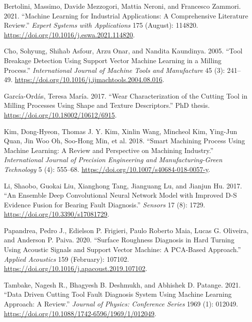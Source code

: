 \documentclass[
  letterpaper,
  DIV=11,
  numbers=noendperiod]{scrartcl}
\newlength{\cslhangindent}
\newlength{\cslentryspacingunit} %
\newenvironment{CSLReferences}[2] %
 {%
  \setlength{\parindent}{0pt}
  \ifodd #1
  \let\oldpar\par
  \def\par{\hangindent=\cslhangindent\oldpar}
  \fi
  \setlength{\parskip}{#2\cslentryspacingunit}
 }%
 {}
\begin{document}
\hypertarget{refs}{}
\begin{CSLReferences}{1}{0}
\leavevmode{}%
Bertolini, Massimo, Davide Mezzogori, Mattia Neroni, and Francesco
Zammori. 2021. {``Machine {Learning} for Industrial Applications: {A}
Comprehensive Literature Review.''} \emph{Expert Systems with
Applications} 175 (August): 114820.
\url{https://doi.org/10.1016/j.eswa.2021.114820}.

\leavevmode{}%
Cho, Sohyung, Shihab Asfour, Arzu Onar, and Nandita Kaundinya. 2005.
{``Tool Breakage Detection Using Support Vector Machine Learning in a
Milling Process.''} \emph{International Journal of Machine Tools and
Manufacture} 45 (3): 241--49.
\url{https://doi.org/10.1016/j.ijmachtools.2004.08.016}.

\leavevmode{}%
García-Ordás, Teresa María. 2017. {``Wear Characterization of the
Cutting Tool in Milling Processes Using Shape and Texture
Descriptors.''} PhD thesis. \url{https://doi.org/10.18002/10612/6915}.

\leavevmode{}%
Kim, Dong-Hyeon, Thomas J. Y. Kim, Xinlin Wang, Mincheol Kim, Ying-Jun
Quan, Jin Woo Oh, Soo-Hong Min, et al. 2018. {``Smart Machining Process
Using Machine Learning: A Review and Perspective on Machining
Industry.''} \emph{International Journal of Precision Engineering and
Manufacturing-Green Technology} 5 (4): 555--68.
\url{https://doi.org/10.1007/s40684-018-0057-y}.

\leavevmode{}%
Li, Shaobo, Guokai Liu, Xianghong Tang, Jianguang Lu, and Jianjun Hu.
2017. {``An {Ensemble} {Deep} {Convolutional} {Neural} {Network} {Model}
with {Improved} {D}-{S} {Evidence} {Fusion} for {Bearing} {Fault}
{Diagnosis}.''} \emph{Sensors} 17 (8): 1729.
\url{https://doi.org/10.3390/s17081729}.

\leavevmode{}%
Papandrea, Pedro J., Edielson P. Frigieri, Paulo Roberto Maia, Lucas G.
Oliveira, and Anderson P. Paiva. 2020. {``Surface Roughness Diagnosis in
Hard Turning Using Acoustic Signals and Support Vector Machine: {A}
{PCA}-Based Approach.''} \emph{Applied Acoustics} 159 (February):
107102. \url{https://doi.org/10.1016/j.apacoust.2019.107102}.

\leavevmode{}%
Tambake, Nagesh R., Bhagyesh B. Deshmukh, and Abhishek D. Patange. 2021.
{``Data {Driven} {Cutting} {Tool} {Fault} {Diagnosis} {System} {Using}
{Machine} {Learning} {Approach}: {A} {Review}.''} \emph{Journal of
Physics: Conference Series} 1969 (1): 012049.
\url{https://doi.org/10.1088/1742-6596/1969/1/012049}.

\end{CSLReferences}
\end{document}
